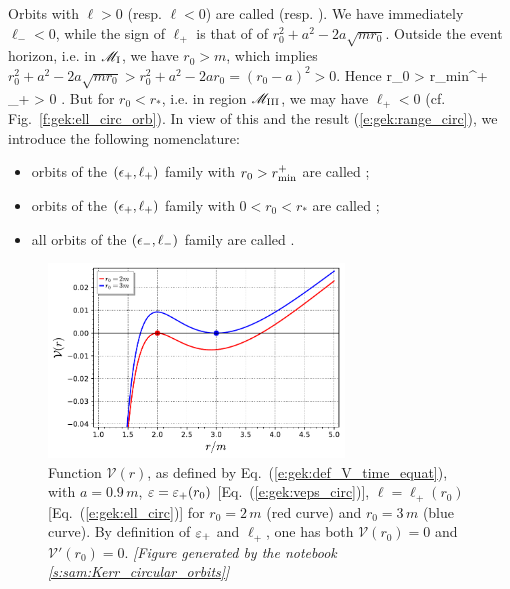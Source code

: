 Orbits with $\ell > 0$ (resp. $\ell < 0$) are called 
(resp. ).
We have immediately $\ell_- < 0$, while the sign of $\ell_+$ is that of
of $r_0^2 + a^2 - 2 a \sqrt{mr_0}$.
Outside the event horizon, i.e. in $\mathscr{M}_{\rm I}$, we have $r_0 > m$, which
implies $r_0^2 + a^2 - 2 a \sqrt{mr_0} > r_0^2 + a^2 - 2 a r_0 = (r_0 - a)^2 > 0$. Hence
\be
    r_0 > r_{\rm min}^+ \quad\Longrightarrow\quad \ell_+ > 0 .
\ee
But for $r_0 < r_*$, i.e. in region $\mathscr{M}_{\rm III}$, we may have $\ell_+ < 0$
(cf. Fig.~\ref{f:gek:ell_circ_orb}).
In view of this and the result (\ref{e:gek:range_circ}), we introduce the following nomenclature:
\begin{itemize}
\item orbits of the $(\epsilon_+,\ell_+)$ family with $r_0 >  r_{\rm min}^+$
are called ;
\item orbits of the $(\epsilon_+,\ell_+)$ family with $0 < r_0 < r_*$
are called ;
\item all orbits of the $(\epsilon_-,\ell_-)$ family
are called .
\end{itemize}

\begin{figure}
\centerline{\includegraphics[width=0.7\textwidth]{gek_V_stability.pdf}}
\caption[]{\label{f:gek:V_stability} \footnotesize
Function $\mathcal{V}(r)$, as defined by Eq.~(\ref{e:gek:def_V_time_equat}),
with $a=0.9\, m$, $\varepsilon = \varepsilon_+(r_0)$ [Eq.~(\ref{e:gek:veps_circ})],
$\ell = \ell_+(r_0)$ [Eq.~(\ref{e:gek:ell_circ})] for $r_0 = 2\, m$
(red curve) and $r_0 = 3 \, m$ (blue curve). By definition of $\varepsilon_+$ and $\ell_+$,
one has both $\mathcal{V}(r_0) = 0$ and $\mathcal{V}'(r_0) = 0$.
\textsl{[Figure generated by the notebook \ref{s:sam:Kerr_circular_orbits}]}
}
\end{figure}

